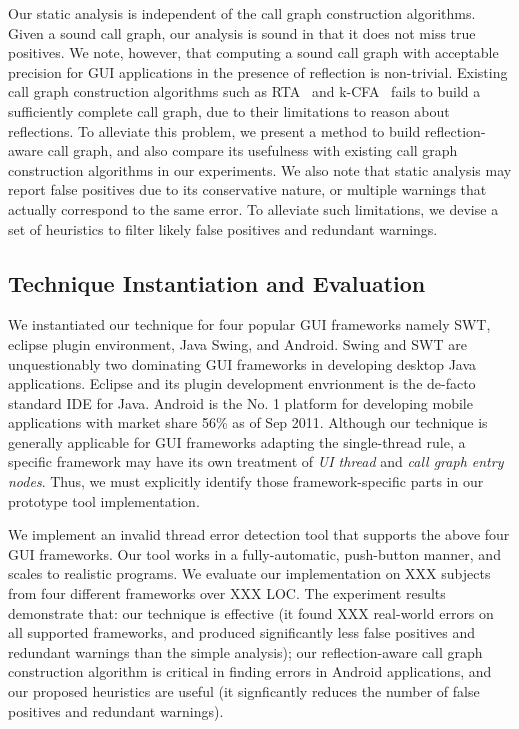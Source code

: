Our static analysis is independent of the call graph construction algorithms.
Given a sound call graph, our analysis is sound in that it does
not miss true positives. We note, however, that computing a sound
call graph with acceptable precision for GUI applications in the presence of reflection
is non-trivial.
Existing call graph construction algorithms such as RTA~\cite{rta}
and k-CFA~\cite{kcfa}
fails to build a sufficiently complete call graph, due to their limitations
to reason about reflections.  To alleviate this problem,
we present a method to build reflection-aware call graph, and
also compare its usefulness with existing call graph construction algorithms in
our experiments. We also note that static analysis may report false positives due to its
conservative nature, or multiple warnings that actually correspond
to the same error. To alleviate such limitations, we devise a set
 of heuristics to filter likely false positives and redundant warnings.

\subsection{Technique Instantiation and Evaluation}


We instantiated our technique for four popular GUI frameworks namely SWT,
eclipse plugin environment, Java Swing, and Android. 
Swing and SWT are unquestionably 
two dominating GUI frameworks in developing desktop Java applications.
Eclipse and its plugin development envrionment is the de-facto standard
IDE for Java. Android is the No. 1 platform for
developing mobile applications with market share 56\% as of Sep 2011.
Although our technique is generally applicable for GUI
frameworks adapting the single-thread rule, a specific framework
may have its own treatment of \textit{UI thread} and \textit{call graph
entry nodes}. Thus, we must explicitly identify those framework-specific
parts in our prototype tool implementation.



We implement an invalid thread error detection tool that supports
the above four GUI frameworks. Our tool works in a fully-automatic,
push-button manner, and scales to realistic programs.
We evaluate our implementation on XXX subjects from four different
frameworks over XXX LOC. The experiment results demonstrate
that: our technique is effective (it found XXX real-world errors
on all supported frameworks, and produced significantly less
false positives and redundant warnings than the simple analysis);
our reflection-aware call graph construction algorithm is
critical in finding errors in Android applications,
and our proposed
heuristics are useful (it signficantly reduces the number of
false positives and redundant warnings).




